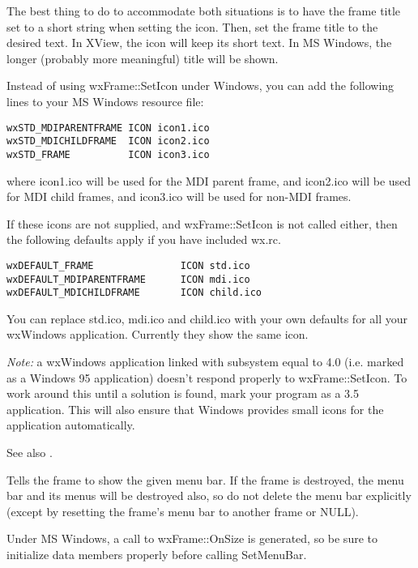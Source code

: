 The best thing to do to accommodate both situations is to have the frame
title set to a short string when setting the icon. Then, set the frame
title to the desired text. In XView, the icon will keep its short text.
In MS Windows, the longer (probably more meaningful) title will be
shown.

Instead of using wxFrame::SetIcon under Windows, you can add the
following lines to your MS Windows resource file:

\begin{verbatim}
wxSTD_MDIPARENTFRAME ICON icon1.ico
wxSTD_MDICHILDFRAME  ICON icon2.ico
wxSTD_FRAME          ICON icon3.ico
\end{verbatim}

where icon1.ico will be used for the MDI parent frame, and icon2.ico
will be used for MDI child frames, and icon3.ico will be used for
non-MDI frames.

If these icons are not supplied, and wxFrame::SetIcon is not called either,
then the following defaults apply if you have included wx.rc.

\begin{verbatim}
wxDEFAULT_FRAME               ICON std.ico
wxDEFAULT_MDIPARENTFRAME      ICON mdi.ico
wxDEFAULT_MDICHILDFRAME       ICON child.ico
\end{verbatim}

You can replace std.ico, mdi.ico and child.ico with your own defaults
for all your wxWindows application. Currently they show the same icon.

{\it Note:} a wxWindows application linked with subsystem equal to 4.0
(i.e. marked as a Windows 95 application) doesn't respond properly
to wxFrame::SetIcon. To work around this until a solution is found,
mark your program as a 3.5 application. This will also ensure
that Windows provides small icons for the application automatically.

See also .



Tells the frame to show the given menu bar.  If the frame is destroyed, the
menu bar and its menus will be destroyed also, so do not delete the menu
bar explicitly (except by resetting the frame's menu bar to another
frame or NULL).

Under MS Windows, a call to wxFrame::OnSize is generated, so be sure to initialize
data members properly before calling SetMenuBar.

